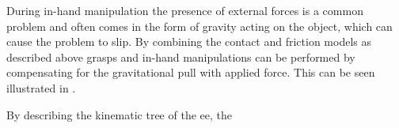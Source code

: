 \begin{center}
    \vspace{15pt}
    \begin{minipage}[t]{.48\linewidth}
        \vspace{0pt}
        \captionsetup{type=figure}
        \label{fig:friction-single-point}
    \end{minipage}%
    \hfill%
    \begin{minipage}[t]{.48\linewidth}
        \vspace{0pt}
        \captionsetup{type=figure}
        \label{fig:friction-surface}
    \end{minipage}%
\end{center}

During in-hand manipulation the presence of external forces is a common problem and often comes in the form of gravity acting on the object, which can cause the problem to slip. By combining the contact and friction models as described above grasps and in-hand manipulations can be performed by compensating for the gravitational pull with applied force. This can be seen illustrated in . \medskip

By describing the kinematic tree of the \gls{ee}, the 

